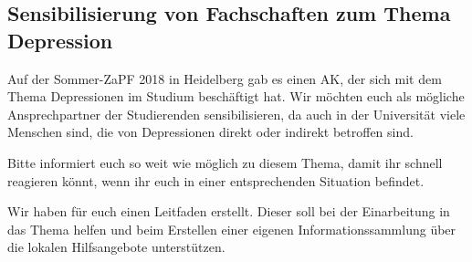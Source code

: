 
\subsection*{Sensibilisierung von Fachschaften zum Thema Depression}
Auf der Sommer-ZaPF 2018 in Heidelberg gab es einen AK, der sich mit dem Thema Depressionen im Studium beschäftigt hat.
Wir möchten euch als mögliche Ansprechpartner der Studierenden sensibilisieren, da auch in der Universität viele Menschen sind, die von Depressionen direkt oder indirekt betroffen sind.

Bitte informiert euch so weit wie möglich zu diesem Thema, damit ihr schnell reagieren könnt, wenn ihr euch in einer entsprechenden Situation befindet.

Wir haben für euch einen Leitfaden erstellt. Dieser soll bei der Einarbeitung in das Thema helfen und beim Erstellen einer eigenen Informationssammlung über die lokalen Hilfsangebote unterstützen.
